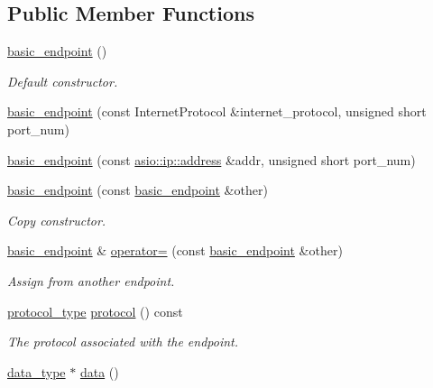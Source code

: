 \subsection*{Public Member Functions}
\begin{DoxyCompactItemize}
\item 
\hyperlink{classasio_1_1ip_1_1basic__endpoint_ac29fba86a79bc79f081d2115cd496a0c}{basic\+\_\+endpoint} ()
\begin{DoxyCompactList}\small\item\em Default constructor. \end{DoxyCompactList}\item 
\hyperlink{classasio_1_1ip_1_1basic__endpoint_a43dd4a6acfd925ceeb1014e28ad7ba64}{basic\+\_\+endpoint} (const Internet\+Protocol \&internet\+\_\+protocol, unsigned short port\+\_\+num)
\item 
\hyperlink{classasio_1_1ip_1_1basic__endpoint_ae67c33179798a7c77d5043192ba2dca5}{basic\+\_\+endpoint} (const \hyperlink{classasio_1_1ip_1_1address}{asio\+::ip\+::address} \&addr, unsigned short port\+\_\+num)
\item 
\hyperlink{classasio_1_1ip_1_1basic__endpoint_a2dd2d6a411a9a4cd13d0879804bcca01}{basic\+\_\+endpoint} (const \hyperlink{classasio_1_1ip_1_1basic__endpoint}{basic\+\_\+endpoint} \&other)
\begin{DoxyCompactList}\small\item\em Copy constructor. \end{DoxyCompactList}\item 
\hyperlink{classasio_1_1ip_1_1basic__endpoint}{basic\+\_\+endpoint} \& \hyperlink{classasio_1_1ip_1_1basic__endpoint_aff92c426a77118ddad284b898d6e420e}{operator=} (const \hyperlink{classasio_1_1ip_1_1basic__endpoint}{basic\+\_\+endpoint} \&other)
\begin{DoxyCompactList}\small\item\em Assign from another endpoint. \end{DoxyCompactList}\item 
\hyperlink{classasio_1_1ip_1_1basic__endpoint_a0a1e636ae6281b37349b7dbdb4791a09}{protocol\+\_\+type} \hyperlink{classasio_1_1ip_1_1basic__endpoint_a5dd3cc452ad940d0bce8dd79bb0b58bc}{protocol} () const 
\begin{DoxyCompactList}\small\item\em The protocol associated with the endpoint. \end{DoxyCompactList}\item 
\hyperlink{classasio_1_1ip_1_1basic__endpoint_a080cc84bcb7c39ec426a3670b9456c44}{data\+\_\+type} $\ast$ \hyperlink{classasio_1_1ip_1_1basic__endpoint_a741c39458bf1bbfa8e2b32ba0bde9913}{data} ()

\end{DoxyCompactItemize}
